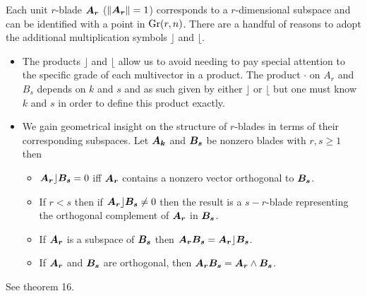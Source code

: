 Each unit $r$-blade $\boldsymbol{A_r}$ ($\|\boldsymbol{A_r}\|=1$) corresponds to a $r$-dimensional subspace and can be identified with a point in $\operatorname{Gr}(r,n)$.
There are a handful of reasons to adopt the additional multiplication symbols $\rfloor$ and $\lfloor$. 
\begin{itemize}
    \item The products $\rfloor$ and $\lfloor$ allow us to avoid needing to pay special attention to the specific grade of each multivector in a product. The product $\cdot$ on $A_r$ and $B_s$ depends on $k$ and $s$ and as such given by either $\rfloor$ or $\lfloor$ but one must know $k$ and $s$ in order to define this product exactly. 
    \item We gain geometrical insight on the structure of $r$-blades in terms of their corresponding subspaces. Let $\boldsymbol{A_k}$ and $\boldsymbol{B_s}$ be nonzero blades with $r,s\geq 1$ then
    \begin{itemize}
        \item $\boldsymbol{A_r} \rfloor \boldsymbol{B_s} =0$ iff $\boldsymbol{A_r}$ contains a nonzero vector orthogonal to $\boldsymbol{B_s}$.
        \item If $r<s$ then if $\boldsymbol{A_r}\rfloor \boldsymbol{B_s} \neq 0$ then the result is a $s-r$-blade representing the orthogonal complement of $\boldsymbol{A_r}$ in $\boldsymbol{B_s}$.
        \item If $\boldsymbol{A_r}$ is a subspace of $\boldsymbol{B_s}$ then $\boldsymbol{A_r}\boldsymbol{B_s} = \boldsymbol{A_r}\rfloor \boldsymbol{B_s}$.
        \item If $\boldsymbol{A_r}$ and $\boldsymbol{B_s}$ are orthogonal, then $\boldsymbol{A_r}\boldsymbol{B_s} = \boldsymbol{A_r} \wedge \boldsymbol{B_s}$.
    \end{itemize}
\end{itemize}
See \cite{chisolm_geometric_2012} theorem 16.


